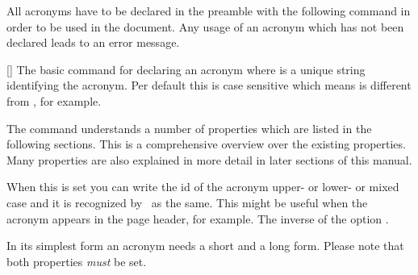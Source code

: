 \documentclass{acro-manual}
\begin{document}
All acronyms have to be declared in the preamble with the following command in
order to be used in the document. Any usage of an acronym which has not been
declared leads to an error message.
\begin{commands}
  []
    The basic command for declaring an acronym where  is a unique
    string identifying the acronym.  Per default this is case sensitive which
    means  is different from , for example.
\end{commands}
The command understands a number of properties which are listed in the
following sections.  This is a comprehensive overview over the existing
properties. Many properties are also explained in more detail in later
sections of this manual.
\begin{options}
    When this is set you can write the \ac{id} of the acronym upper- or lower-
    or mixed case and it is recognized by \acro\ as the same.  This might be
    useful when the acronym appears in the page header, for example.
    The inverse of the option .
\end{options}

\begin{bewareofthedog}
  In its simplest form an acronym needs a short and a long form.  Please note
  that both properties \emph{must} be set.
\end{bewareofthedog}
\end{document}
